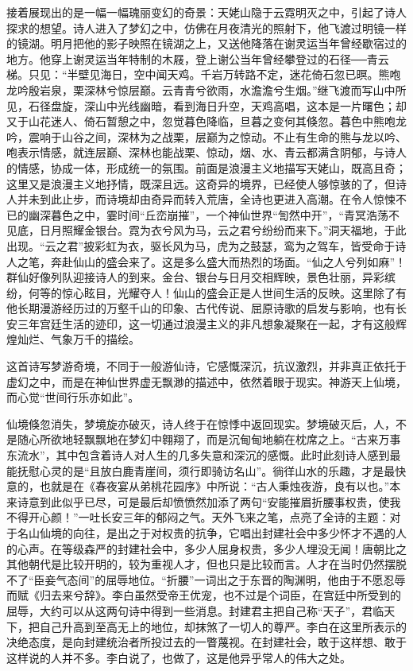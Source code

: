 \documentclass[letterpaper,12pt,english]{sphinxmanual}
\begin{document}
接着展现出的是一幅一幅瑰丽变幻的奇景：天姥山隐于云霓明灭之中，引起了诗人探求的想望。诗人进入了梦幻之中，仿佛在月夜清光的照射下，他飞渡过明镜一样的镜湖。明月把他的影子映照在镜湖之上，又送他降落在谢灵运当年曾经歇宿过的地方。他穿上谢灵运当年特制的木屐，登上谢公当年曾经攀登过的石径──青云梯。只见：“半壁见海日，空中闻天鸡。千岩万转路不定，迷花倚石忽已暝。熊咆龙吟殷岩泉，栗深林兮惊层巅。云青青兮欲雨，水澹澹兮生烟。”继飞渡而写山中所见，石径盘旋，深山中光线幽暗，看到海日升空，天鸡高唱，这本是一片曙色；却又于山花迷人、倚石暂憩之中，忽觉暮色降临，旦暮之变何其倏忽。暮色中熊咆龙吟，震响于山谷之间，深林为之战栗，层巅为之惊动。不止有生命的熊与龙以吟、咆表示情感，就连层巅、深林也能战栗、惊动，烟、水、青云都满含阴郁，与诗人的情感，协成一体，形成统一的氛围。前面是浪漫主义地描写天姥山，既高且奇；这里又是浪漫主义地抒情，既深且远。这奇异的境界，已经使人够惊骇的了，但诗人并未到此止步，而诗境却由奇异而转入荒唐，全诗也更进入高潮。在令人惊悚不已的幽深暮色之中，霎时间“丘峦崩摧”，一个神仙世界“訇然中开”，“青冥浩荡不见底，日月照耀金银台。霓为衣兮风为马，云之君兮纷纷而来下。”洞天福地，于此出现。“云之君”披彩虹为衣，驱长风为马，虎为之鼓瑟，鸾为之驾车，皆受命于诗人之笔，奔赴仙山的盛会来了。这是多么盛大而热烈的场面。“仙之人兮列如麻”！群仙好像列队迎接诗人的到来。金台、银台与日月交相辉映，景色壮丽，异彩缤纷，何等的惊心眩目，光耀夺人！仙山的盛会正是人世间生活的反映。这里除了有他长期漫游经历过的万壑千山的印象、古代传说、屈原诗歌的启发与影响，也有长安三年宫廷生活的迹印，这一切通过浪漫主义的非凡想象凝聚在一起，才有这般辉煌灿烂、气象万千的描绘。

这首诗写梦游奇境，不同于一般游仙诗，它感慨深沉，抗议激烈，并非真正依托于虚幻之中，而是在神仙世界虚无飘渺的描述中，依然着眼于现实。神游天上仙境，而心觉“世间行乐亦如此”。

仙境倏忽消失，梦境旋亦破灭，诗人终于在惊悸中返回现实。梦境破灭后，人，不是随心所欲地轻飘飘地在梦幻中翱翔了，而是沉甸甸地躺在枕席之上。“古来万事东流水”，其中包含着诗人对人生的几多失意和深沉的感慨。此时此刻诗人感到最能抚慰心灵的是“且放白鹿青崖间，须行即骑访名山”。徜徉山水的乐趣，才是最快意的，也就是在《春夜宴从弟桃花园序》中所说：“古人秉烛夜游，良有以也。”本来诗意到此似乎已尽，可是最后却愤愤然加添了两句“安能摧眉折腰事权贵，使我不得开心颜！”一吐长安三年的郁闷之气。天外飞来之笔，点亮了全诗的主题：对于名山仙境的向往，是出之于对权贵的抗争，它唱出封建社会中多少怀才不遇的人的心声。在等级森严的封建社会中，多少人屈身权贵，多少人埋没无闻！唐朝比之其他朝代是比较开明的，较为重视人才，但也只是比较而言。人才在当时仍然摆脱不了“臣妾气态间”的屈辱地位。“折腰”一词出之于东晋的陶渊明，他由于不愿忍辱而赋《归去来兮辞》。李白虽然受帝王优宠，也不过是个词臣，在宫廷中所受到的屈辱，大约可以从这两句诗中得到一些消息。封建君主把自己称“天子”，君临天下，把自己升高到至高无上的地位，却抹煞了一切人的尊严。李白在这里所表示的决绝态度，是向封建统治者所投过去的一瞥蔑视。在封建社会，敢于这样想、敢于这样说的人并不多。李白说了，也做了，这是他异乎常人的伟大之处。
\end{document}
